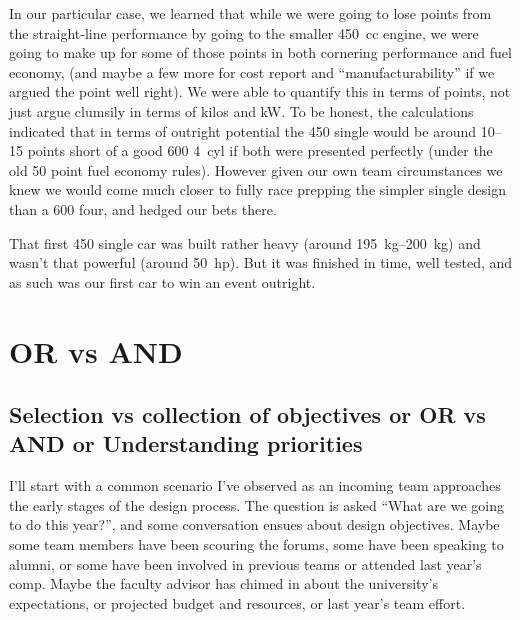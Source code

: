 \documentclass[10pt, a4paper, article, oneside, twocolumn, final]{memoir}
\begin{document}
In our particular case, we learned that while we were going to lose points from the straight-line performance by going to the smaller \SI{450}{cc} engine, we were going to make up for some of those points in both cornering performance and fuel economy, (and maybe a few more for cost report and “manufacturability” if we argued the point well right). We were able to quantify this in terms of points, not just argue clumsily in terms of kilos and kW. To be honest, the calculations indicated that in terms of outright potential the \num{450} single would be around \numrange{10}{15} points short of a good \num{600} \SI{4}{cyl} if both were presented perfectly (under the old \num{50} point fuel economy rules). However given our own team circumstances we knew we would come much closer to fully race prepping the simpler single design than a \num{600} four, and hedged our bets there. 

That first \num{450} single car was built rather heavy (around \SIrange{195}{200}{\kilogram}) and wasn't that powerful (around \SI{50}{hp}). But it was finished in time, well tested, and as such was our first car to win an event outright. 



\chapter*{OR vs AND}

\section*{Selection vs collection of objectives or OR vs AND or Understanding priorities}

I’ll start with a common scenario I’ve observed as an incoming team approaches the early stages of the design process. The question is asked “What are we going to do this year?”, and some conversation ensues about design objectives. Maybe some team members have been scouring the forums, some have been speaking to alumni, or some have been involved in previous teams or attended last year's comp. Maybe the faculty advisor has chimed in about the university’s expectations, or projected budget and resources, or last year’s team effort. 
\end{document}
